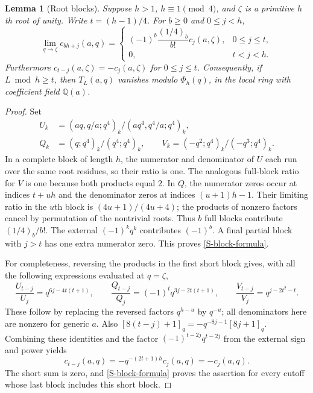 \documentclass[11pt,letterpaper]{article}
\newtheorem{lemma}[theorem]{Lemma}
\numberwithin{equation}{section}
\begin{document}
\begin{lemma}[Root blocks]\label{S-blocks}
Suppose $h>1$, $h\equiv1\pmod4$, and $\zeta$ is a primitive $h$th root
of unity. Write $t=(h-1)/4$. For $b\ge0$ and $0\le j<h$,
\begin{equation}\label{S-block-formula}
 \lim_{q\to\zeta}c_{bh+j}(a,q)=
 \begin{cases}
 (-1)^b\dfrac{(1/4)_b}{b!}c_j(a,\zeta),&0\le j\le t,\\
 0,&t<j<h.
 \end{cases}
\end{equation}
Furthermore $c_{t-j}(a,\zeta)=-c_j(a,\zeta)$ for $0\le j\le t$.
Consequently, if $L\bmod h\ge t$, then $T_L(a,q)$ vanishes modulo
$\Phi_h(q)$, in the local ring with coefficient field $\mathbb Q(a)$.
\end{lemma}
\begin{proof}
Set
\[
\begin{aligned}
 U_k&=(aq,q/a;q^4)_k/(aq^4,q^4/a;q^4)_k,\\
 Q_k&=(q;q^4)_k/(q^4;q^4)_k,\qquad
 V_k=(-q^2;q^4)_k/(-q^3;q^4)_k.
\end{aligned}
\]
In a complete block of length $h$, the numerator and denominator of
$U$ each run over the same root residues, so their ratio is one.
The analogous full-block ratio for $V$ is one because both products
equal $2$. In $Q$, the numerator zeros occur at indices $t+uh$ and
the denominator zeros at indices $(u+1)h-1$. Their limiting ratio in
the $u$th block is $(4u+1)/(4u+4)$; the products of nonzero factors
cancel by permutation of the nontrivial roots. Thus $b$ full blocks
contribute $(1/4)_b/b!$. The external $(-1)^kq^k$ contributes
$(-1)^b$. A final partial block with $j>t$ has one extra numerator
zero. This proves \eqref{S-block-formula}.

For completeness, reversing the products in the first short block
gives, with all the following expressions evaluated at $q=\zeta$,
\[
 \frac{U_{t-j}}{U_j}=q^{6j-4t(t+1)},\qquad
 \frac{Q_{t-j}}{Q_j}=(-1)^tq^{3j-2t(t+1)},\qquad
 \frac{V_{t-j}}{V_j}=q^{j-2t^2-t}.
\]
These follow by replacing the reversed factors $q^{h-u}$ by $q^{-u}$;
all denominators here are nonzero for generic $a$.
Also
$[8(t-j)+1]_q=-q^{-8j-1}[8j+1]_q$.
Combining these identities and the factor $(-1)^{t-2j}q^{t-2j}$
from the external sign and power yields
\[
 c_{t-j}(a,q)=-q^{-(2t+1)h}c_j(a,q)=-c_j(a,q).
\]
The short sum is zero, and \eqref{S-block-formula} proves the assertion
for every cutoff whose last block includes this short block.
\end{proof}
\end{document}
